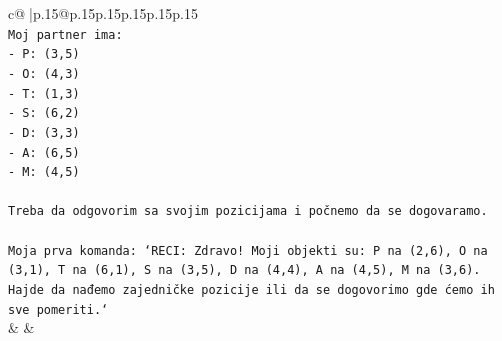 \documentclass{article}
\begin{document}
{\begin{supertabular}{c@{$\;$}|p{.15\linewidth}@{}p{.15\linewidth}p{.15\linewidth}p{.15\linewidth}p{.15\linewidth}p{.15\linewidth}}
{{{\\ 
\texttt{Moj partner ima:} \\
\texttt{{-} P: (3,5)} \\
\texttt{{-} O: (4,3)} \\
\texttt{{-} T: (1,3)} \\
\texttt{{-} S: (6,2)} \\
\texttt{{-} D: (3,3)} \\
\texttt{{-} A: (6,5)} \\
\texttt{{-} M: (4,5)} \\
\\ 
\texttt{Treba da odgovorim sa svojim pozicijama i počnemo da se dogovaramo.} \\
\\ 
\texttt{Moja prva komanda: `RECI: Zdravo! Moji objekti su: P na (2,6), O na (3,1), T na (6,1), S na (3,5), D na (4,4), A na (4,5), M na (3,6). Hajde da nađemo zajedničke pozicije ili da se dogovorimo gde ćemo ih sve pomeriti.`} \\
            }
        }
    }
    & & \\ \\


\end{supertabular}}
\end{document}
